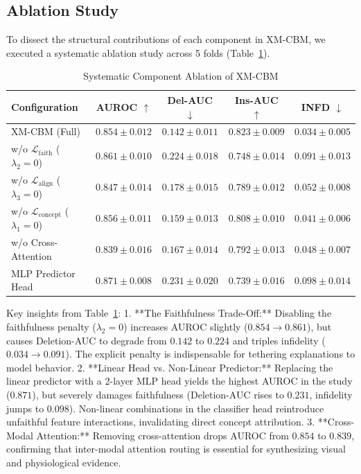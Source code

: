 \documentclass[10pt,journal,compsoc,twocolumn]{IEEEtran}
\begin{document}
\subsection{Ablation Study}
To dissect the structural contributions of each component in XM-CBM, we executed a systematic ablation study across 5 folds (Table~\ref{tab:ablation}).

\begin{table}[h]
\centering
\caption{Systematic Component Ablation of XM-CBM}
\label{tab:ablation}
\begin{tabular}{lcccc}
\toprule
\textbf{Configuration} & \textbf{AUROC} $\uparrow$ & \textbf{Del-AUC} $\downarrow$ & \textbf{Ins-AUC} $\uparrow$ & \textbf{INFD} $\downarrow$ \\
\midrule
XM-CBM (Full) & $0.854 \pm 0.012$ & $\mathbf{0.142 \pm 0.011}$ & $\mathbf{0.823 \pm 0.009}$ & $\mathbf{0.034 \pm 0.005}$ \\
w/o $\mathcal{L}_{\text{faith}}$ ($\lambda_2=0$) & $0.861 \pm 0.010$ & $0.224 \pm 0.018$ & $0.748 \pm 0.014$ & $0.091 \pm 0.013$ \\
w/o $\mathcal{L}_{\text{align}}$ ($\lambda_3=0$) & $0.847 \pm 0.014$ & $0.178 \pm 0.015$ & $0.789 \pm 0.012$ & $0.052 \pm 0.008$ \\
w/o $\mathcal{L}_{\text{concept}}$ ($\lambda_1=0$) & $0.856 \pm 0.011$ & $0.159 \pm 0.013$ & $0.808 \pm 0.010$ & $0.041 \pm 0.006$ \\
w/o Cross-Attention & $0.839 \pm 0.016$ & $0.167 \pm 0.014$ & $0.792 \pm 0.013$ & $0.048 \pm 0.007$ \\
MLP Predictor Head & $\mathbf{0.871 \pm 0.008}$ & $0.231 \pm 0.020$ & $0.739 \pm 0.016$ & $0.098 \pm 0.014$ \\
\bottomrule
\end{tabular}
\end{table}

Key insights from Table~\ref{tab:ablation}:
1. **The Faithfulness Trade-Off:** Disabling the faithfulness penalty ($\lambda_2 = 0$) increases AUROC slightly ($0.854 \to 0.861$), but causes Deletion-AUC to degrade from $0.142$ to $0.224$ and triples infidelity ($0.034 \to 0.091$). The explicit penalty is indispensable for tethering explanations to model behavior.
2. **Linear Head vs. Non-Linear Predictor:** Replacing the linear predictor with a 2-layer MLP head yields the highest AUROC in the study ($0.871$), but severely damages faithfulness (Deletion-AUC rises to $0.231$, infidelity jumps to $0.098$). Non-linear combinations in the classifier head reintroduce unfaithful feature interactions, invalidating direct concept attribution.
3. **Cross-Modal Attention:** Removing cross-attention drops AUROC from $0.854$ to $0.839$, confirming that inter-modal attention routing is essential for synthesizing visual and physiological evidence.
\end{document}

